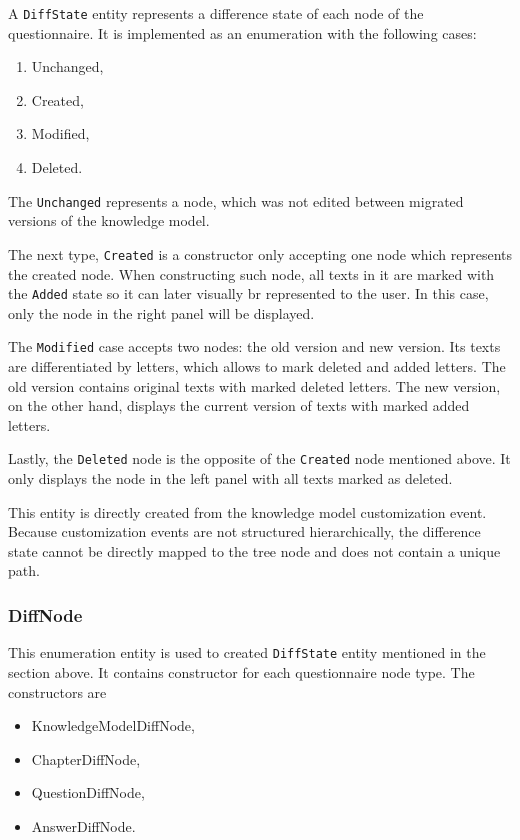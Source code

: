 A \texttt{DiffState} entity represents a difference state of each node of the questionnaire.
It is implemented as an enumeration with the following cases:

\begin{enumerate}
    \item Unchanged,
    \item Created,
    \item Modified,
    \item Deleted.
\end{enumerate}

The \texttt{Unchanged} represents a node, which was not edited between migrated versions of the knowledge model.

The next type, \texttt{Created} is a constructor only accepting one node which represents the created node.
When constructing such node, all texts in it are marked with the \texttt{Added} state so it can later visually br represented to the user.
In this case, only the node in the right panel will be displayed.

The \texttt{Modified} case accepts two nodes: the old version and new version.
Its texts are differentiated by letters, which allows to mark deleted and added letters.
The old version contains original texts with marked deleted letters.
The new version, on the other hand, displays the current version of texts with marked added letters.

Lastly, the \texttt{Deleted} node is the opposite of the \texttt{Created} node mentioned above.
It only displays the node in the left panel with all texts marked as deleted.

This entity is directly created from the knowledge model customization event.
Because customization events are not structured hierarchically, the difference state cannot be directly mapped to the tree node and does not contain a unique path.

\subsubsection*{DiffNode}

This enumeration entity is used to created \texttt{DiffState} entity mentioned in the section above.
It contains constructor for each questionnaire node type.
The constructors are

\begin{itemize}
    \item KnowledgeModelDiffNode,
    \item ChapterDiffNode,
    \item QuestionDiffNode,
    \item AnswerDiffNode.
\end{itemize}

